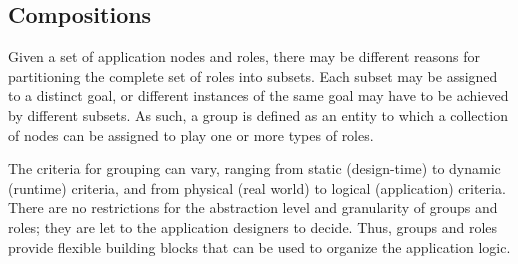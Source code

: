 \subsection{Compositions}




Given a set of application nodes and roles, there may be different reasons for partitioning the complete set of roles into subsets. Each subset may be assigned to a distinct goal, or different instances of the same goal may have to be achieved by different subsets. As such, a group is defined as an entity to which a collection of nodes can be assigned to play one or more types of roles. 

The criteria for grouping can vary, ranging from static (design-time) to dynamic (runtime) criteria, and from physical (real world) to logical (application) criteria. There are no restrictions for the abstraction level and granularity of groups and roles; they are let to the application designers to decide. Thus, groups and roles provide flexible building blocks that can be used to organize the application logic.

